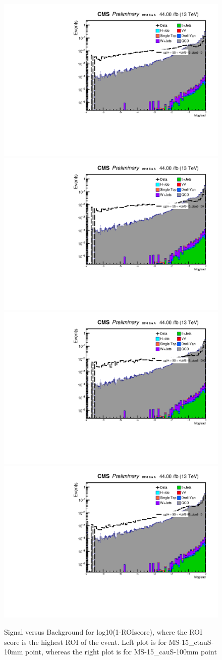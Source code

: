 %

 \begin{figure}[h!]
   \caption{Signal versus Background for log10(1-ROIscore), where the ROI score is the highest ROI of the event. Left plot is for MS-15\_ctauS-10mm point, whereas the right plot is for MS-15\_cauS-100mm point}
   \label{fig:leadROIscore}
   \centering
   \includegraphics[width=0.47\linewidth]{figs/log_AnalysisNote_MS-15_ctauS-10_hloglead.pdf}
   \includegraphics[width=0.47\linewidth]{figs/log_AnalysisNote_MS-15_ctauS-100_hloglead.pdf}
   \includegraphics[width=0.47\linewidth]{figs/log_AnalysisNote_MS-15_ctauS-1000_hloglead.pdf}
   \includegraphics[width=0.47\linewidth]{figs/log_AnalysisNote_MS-55_ctauS-10_hloglead.pdf}
 \end{figure}


